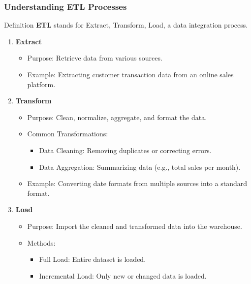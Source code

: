 \documentclass{beamer}
\begin{document}
\begin{frame}[fragile]
    \frametitle{Understanding ETL Processes}
    \begin{block}{Definition}
        \textbf{ETL} stands for Extract, Transform, Load, a data integration process.
    \end{block}
    \begin{enumerate}
        \item \textbf{Extract}
        \begin{itemize}
            \item Purpose: Retrieve data from various sources.
            \item Example: Extracting customer transaction data from an online sales platform.
        \end{itemize}
        
        \item \textbf{Transform}
        \begin{itemize}
            \item Purpose: Clean, normalize, aggregate, and format the data.
            \item Common Transformations:
            \begin{itemize}
                \item Data Cleaning: Removing duplicates or correcting errors.
                \item Data Aggregation: Summarizing data (e.g., total sales per month).
            \end{itemize}
            \item Example: Converting date formats from multiple sources into a standard format.
        \end{itemize}
        
        \item \textbf{Load}
        \begin{itemize}
            \item Purpose: Import the cleaned and transformed data into the warehouse.
            \item Methods: 
            \begin{itemize}
                \item Full Load: Entire dataset is loaded.
                \item Incremental Load: Only new or changed data is loaded.
            \end{itemize}
        \end{itemize}
    \end{enumerate}
\end{frame}
\end{document}
